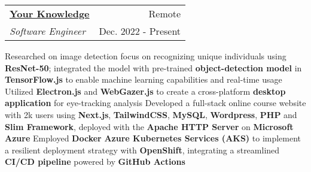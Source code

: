 \newcommand{\resumeExpEntry}[4]{
  \vspace{5pt}\item
    \begin{tabular*}{0.97\textwidth}{l@{\extracolsep{\fill}}r}
      \textbf{#1} & \small #2 \\
      \textit{#3} & \small #4 \\
    \end{tabular*}\vspace{-5pt}
}

\resumeExpEntry
{\href{https://yourknowledge.online}{Your Knowledge}}
{Remote}
{Software Engineer}
{Dec. 2022 - Present}
{
  \resumeItemListStart
    \resumeItem
    {Researched on image detection focus on recognizing unique individuals using \textbf{ResNet-50}; integrated the model with pre-trained \textbf{object-detection model} in \textbf{TensorFlow.js} to enable machine learning capabilities and real-time usage}
    \resumeItem
    {Utilized \textbf{Electron.js} and \textbf{WebGazer.js} to create a cross-platform \textbf{desktop application} for eye-tracking analysis}
    \resumeItem
    {Developed a full-stack online course website with 2k users using \textbf{Next.js}, \textbf{TailwindCSS}, \textbf{MySQL}, \textbf{Wordpress}, \textbf{PHP} and \textbf{Slim Framework}, deployed with the \textbf{Apache HTTP Server} on \textbf{Microsoft Azure}}
    \resumeItem
    {Employed \textbf{Docker} \textbf{Azure Kubernetes Services (AKS)} to implement a resilient deployment strategy with \textbf{OpenShift}, integrating a streamlined \textbf{CI/CD pipeline} powered by \textbf{GitHub Actions}}
  \resumeItemListEnd
}

